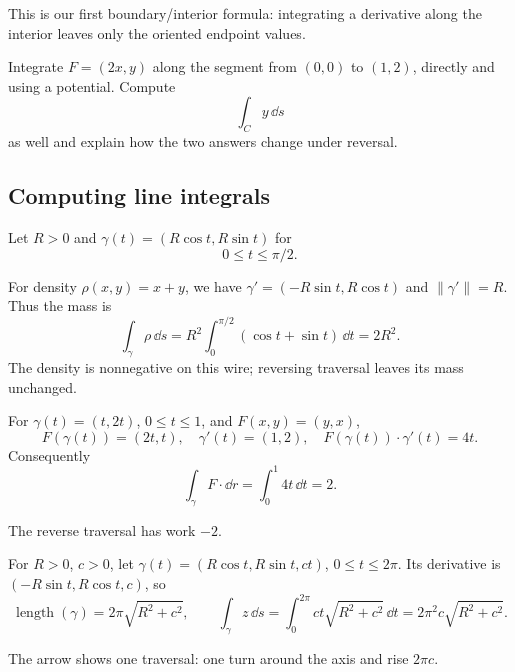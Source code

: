 This is our first boundary/interior formula: integrating a derivative along
the interior leaves only the oriented endpoint values.

\begin{exercise}
Integrate $F=(2x,y)$ along the segment from $(0,0)$ to $(1,2)$, directly
and using a potential. Compute
\[
\int_C y\,\dd s
\]
 as well and explain how
the two answers change under reversal.
\end{exercise}


\subsection{Computing line integrals}
\begin{center}
\end{center}
\begin{example}
Let $R>0$ and $\gamma(t)=(R\cos t,R\sin t)$ for
\[
0\leq t\leq\pi/2.
\]

For density $\rho(x,y)=x+y$, we have
$\gamma'=(-R\sin t,R\cos t)$ and $\|\gamma'\|=R$. Thus the mass is
\[
\int_\gamma\rho\,\dd s=R^2\int_0^{\pi/2}(\cos t+\sin t)\,\dd t=2R^2.
\]
The density is nonnegative on this wire; reversing traversal leaves its
mass unchanged.
\end{example}
\begin{example}
For $\gamma(t)=(t,2t)$, $0\leq t\leq1$, and $F(x,y)=(y,x)$,
\[
F(\gamma(t))=(2t,t),\quad \gamma'(t)=(1,2),\quad
F(\gamma(t))\cdot\gamma'(t)=4t.
\]
Consequently
\[
\int_\gamma F\cdot\dd r=\int_0^1 4t\,\dd t=2.
\]

The reverse traversal has work $-2$.
\end{example}
\begin{example}[A helix]
For $R>0$, $c>0$, let $\gamma(t)=(R\cos t,R\sin t,ct)$,
$0\leq t\leq2\pi$. Its derivative is $(-R\sin t,R\cos t,c)$, so
\[
\operatorname{length}(\gamma)=2\pi\sqrt{R^2+c^2},\qquad
\int_\gamma z\,\dd s=\int_0^{2\pi}ct\sqrt{R^2+c^2}\,\dd t
=2\pi^2c\sqrt{R^2+c^2}.
\]
\begin{center}
\end{center}
The arrow shows one traversal: one turn around the axis and rise $2\pi c$.
\end{example}

